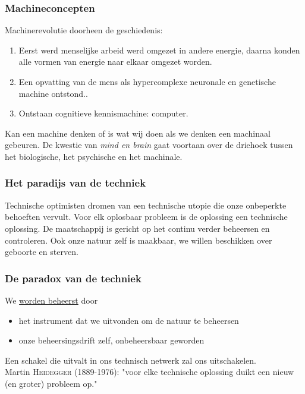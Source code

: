 \subsubsection*{Machineconcepten}
Machinerevolutie doorheen de geschiedenis:
\begin{enumerate}
\item Eerst werd menselijke arbeid werd omgezet in andere energie, daarna konden alle vormen van energie naar elkaar omgezet worden.
\item Een opvatting van de mens als hypercomplexe neuronale en genetische machine ontstond..
\item Ontstaan cognitieve kennismachine: computer.
\end{enumerate}
Kan een machine denken of is wat wij doen als we denken een machinaal gebeuren. De kwestie van \textit{mind en brain} gaat voortaan over de driehoek tussen het biologische, het psychische en het machinale.
\subsubsection*{Het paradijs van de techniek}
Technische optimisten dromen van een technische utopie die onze onbeperkte behoeften vervult. Voor elk oplosbaar probleem is de oplossing een technische oplossing. De maatschappij is gericht op het continu verder beheersen en controleren. Ook onze natuur zelf is maakbaar, we willen beschikken over geboorte en sterven.
\subsubsection*{De paradox van de techniek}
We \underline{worden beheerst} door
\begin{itemize}
\item het instrument dat we uitvonden om de natuur te beheersen
\item onze beheersingsdrift zelf, onbeheersbaar geworden
\end{itemize}
Een schakel die uitvalt in ons technisch netwerk zal ons uitschakelen. 
\\Martin \textsc{Heidegger} (1889-1976): "voor elke technische oplossing duikt een nieuw (en groter) probleem op."
